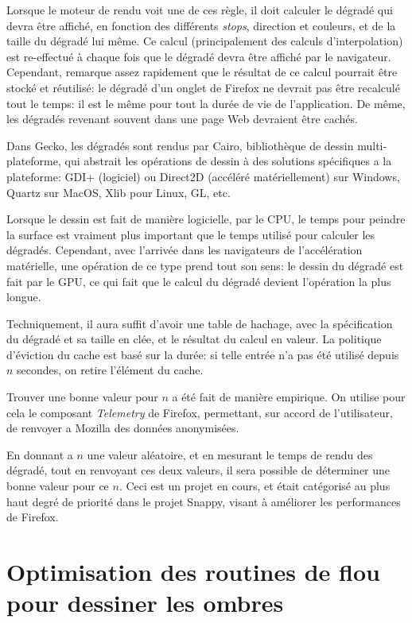 \documentclass[a4paper,10pt]{article}
\begin{document}
\begin{multicols}{2}
  Lorsque le moteur de rendu voit une de ces règle, il doit calculer le dégradé
  qui devra être affiché, en fonction des différents \emph{stops}, direction et
  couleurs, et de la taille du dégradé lui même. Ce calcul (principalement des
  calculs d'interpolation) est re-effectué à chaque fois que le dégradé devra
  être affiché par le navigateur. Cependant, remarque assez rapidement que le
  résultat de ce calcul pourrait être stocké et réutilisé: le dégradé d'un
  onglet de Firefox ne devrait pas être recalculé tout le temps: il est le même
  pour tout la durée de vie de l'application. De même, les dégradés revenant
  souvent dans une page Web devraient être cachés.

  Dans Gecko, les dégradés sont rendus par Cairo, bibliothèque de dessin
  multi-plateforme, qui abstrait les opérations de dessin à des solutions
  spécifiques a la plateforme: GDI+ (logiciel) ou Direct2D (accéléré
  matériellement) sur Windows, Quartz sur MacOS, Xlib pour Linux, GL, etc.

  Lorsque le dessin est fait de manière logicielle, par le CPU, le temps pour
  peindre la surface est vraiment plus important que le temps utilisé pour
  calculer les dégradés. Cependant, avec l'arrivée dans les navigateurs de
  l'accélération matérielle, une opération de ce type prend tout son sens: le
  dessin du dégradé est fait par le GPU, ce qui fait que le calcul du dégradé
  devient l'opération la plus longue.

  Techniquement, il aura suffit d'avoir une table de hachage, avec la
  spécification du dégradé et sa taille en clée, et le résultat du calcul en
  valeur. La politique d'éviction du cache est basé sur la durée: si telle
  entrée n'a pas été utilisé depuis $n$ secondes, on retire l'élément du cache.

  Trouver une bonne valeur pour $n$ a été fait de manière empirique. On utilise
  pour cela le composant \emph{Telemetry} de Firefox, permettant, sur accord de
  l'utilisateur, de renvoyer a Mozilla des données anonymisées.

  En donnant a $n$ une valeur aléatoire, et en mesurant le temps de rendu des
  dégradé, tout en renvoyant ces deux valeurs, il sera possible de déterminer
  une bonne valeur pour ce $n$. Ceci est un projet en cours, et était catégorisé
  au plus haut degré de priorité dans le projet Snappy, visant à améliorer les
  performances de Firefox.

  \section{Optimisation des routines de flou pour dessiner les ombres}


\end{multicols}
\end{document}
